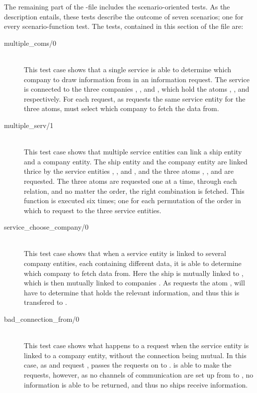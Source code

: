 The remaining part of the -file includes the scenario-oriented tests. As the description entails, these tests describe the outcome of seven scenarios; one for every scenario-function test. The tests, contained in this section of the file are:

\begin{description}
  \item[{multiple\_coms/0}]\ \\
    This test case shows that a single service is able to determine which company to draw information from in an information request. The service  is connected to the three companies , , and , which hold the atoms , , and  respectively. For each request, as  requests the same service entity  for the three atoms,  must select which company to fetch the data from.
  \item[{multiple\_serv/1}]\ \\
    This test case shows that multiple service entities can link a ship entity and a company entity. The ship entity  and the company entity  are linked thrice by the service entities , , and , and the three atoms , , and  are requested. The three atoms are requested one at a time, through each relation, and no matter the order, the right combination is fetched. This function is executed six times; one for each permutation of the order in which to request to the three service entities.
  \item[{service\_choose\_company/0}]\ \\
    This test case shows that when a service entity is linked to several company entities, each containing different data, it is able to determine which company to fetch data from. Here the ship  is mutually linked to , which is then mutually linked to companies . As  requests the atom ,  will have to determine that  holds the relevant information, and thus this is transfered to .
  \item[{bad\_connection\_from/0}]\ \\
    This test case shows what happens to a request when the service entity is linked to a company entity, without the connection being mutual. In this case, as  and  request ,  passes the requests on to .  is able to make the requests, however, as no channels of communication are set up from  to , no information is able to be returned, and thus no ships receive information.

\end{description}
